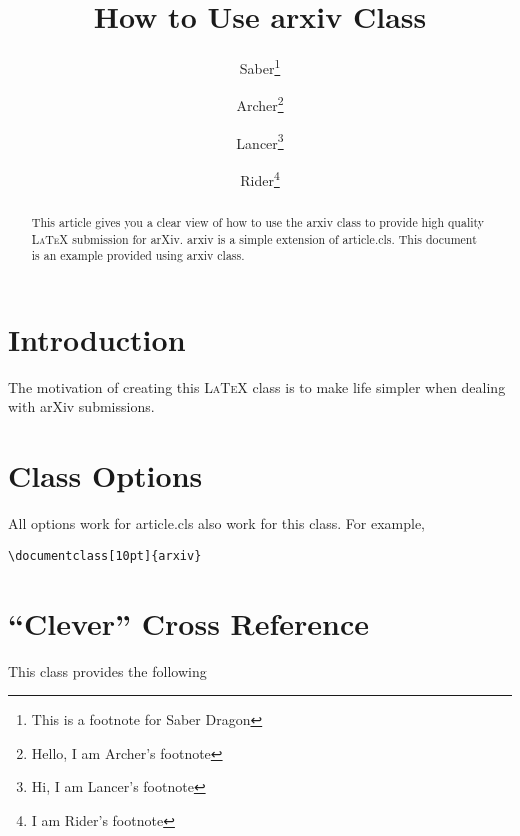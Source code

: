 \documentclass[11pt]{arxiv}
\begin{document}
\title{How to Use arxiv Class}
\author{Saber\thanks{This is a footnote for Saber Dragon}
\and
Archer\thanks{Hello, I am Archer's footnote}
\and
Lancer\thanks{Hi, I am Lancer's footnote}
\and
Rider\thanks{I am Rider's footnote}
}
\maketitle

\begin{abstract}
This article gives you a clear view of how to use the arxiv class to provide high quality
\textsc{LaTeX} submission for arXiv.
arxiv is a simple extension of {\code article.cls}.
This document is an example provided using arxiv class.

\end{abstract}


\section{Introduction}\label{sec:introduction}

The motivation of creating this \textsc{LaTeX} class is to make life simpler when dealing with arXiv submissions.


\section{Class Options}\label{sec:classOptions}

All options work for {\code article.cls} also work for this class.
For example,

\begin{verbatim}
\documentclass[10pt]{arxiv}
\end{verbatim}


\section{``Clever'' Cross Reference}\label{sec:autoref}
This class provides the following 
\end{document}

